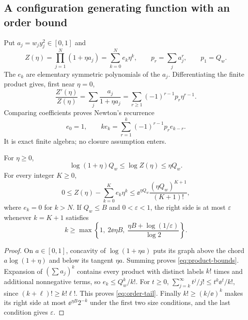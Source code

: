 \subsection{A configuration generating function with an order bound}

Put $a_j=w_jy_j^2\in[0,1]$ and
\begin{equation}\label{eq:configuration-product}
 Z(\eta)=\prod_{j=1}^N(1+\eta a_j)
        =\sum_{k=0}^N e_k\eta^k,\qquad
 p_r=\sum_j a_j^r,\qquad p_1=Q_w.
\end{equation}
The $e_k$ are elementary symmetric polynomials of the $a_j$.
Differentiating the finite product gives, first near $\eta=0$,
\[
 \frac{Z'(\eta)}{Z(\eta)}
 =\sum_j\frac{a_j}{1+\eta a_j}
 =\sum_{r\ge1}(-1)^{r-1}p_r\eta^{r-1}.
\]
Comparing coefficients proves Newton's recurrence
\begin{equation}\label{eq:newton}
 e_0=1,\qquad
 ke_k=\sum_{r=1}^k(-1)^{r-1}p_re_{k-r}.
\end{equation}
It is exact finite algebra; no closure assumption enters.

\begin{proposition}\label{prop:product}
For $\eta\ge0$,
\begin{equation}\label{eq:product-bounds}
 \log(1+\eta)Q_w\le\log Z(\eta)\le\eta Q_w .
\end{equation}
For every integer $K\ge0$,
\begin{equation}\label{eq:order-tail}
 0\le Z(\eta)-\sum_{k=0}^Ke_k\eta^k
 \le \ee^{\eta Q_w}
       \frac{(\eta Q_w)^{K+1}}{(K+1)!},
\end{equation}
where $e_k=0$ for $k>N$. If $Q_w\le B$ and $0<\varepsilon<1$,
the right side is at most $\varepsilon$ whenever $k=K+1$ satisfies
\begin{equation}\label{eq:order-choice}
 k\ge\max\left\{1,\ 2\ee\eta B,\
           \frac{\eta B+\log(1/\varepsilon)}{\log2}\right\}.
\end{equation}
\end{proposition}
\begin{proof}
On $a\in[0,1]$, concavity of $\log(1+\eta a)$ puts its graph
above the chord $a\log(1+\eta)$ and below its tangent $\eta a$.
Summing proves \eqref{eq:product-bounds}.
Expansion of $(\sum a_j)^k$ contains every product with distinct labels
$k!$ times and additional nonnegative terms, so $e_k\le Q_w^k/k!$.
For $t\ge0$,
$\sum_{j=k}^\infty t^j/j!\le t^k\ee^t/k!$, since
$(k+\ell)!\ge k!\ell!$. This proves \eqref{eq:order-tail}.
Finally $k!\ge(k/\ee)^k$ makes its right side at most
$\ee^{\eta B}2^{-k}$ under the first two size conditions, and the
last condition gives $\varepsilon$.
\end{proof}

